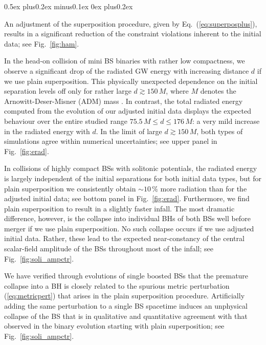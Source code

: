 \documentclass[]{iopart}
\begin{document}
\begin{list}{\rm{\bf ()}}{
                
             \parsep0.5ex plus0.2ex minus0.1ex \itemsep0ex plus0.2ex}
  \item An adjustment of the superposition procedure, given 
  by Eq.~(\ref{eq:superposplus}), results in a significant
  reduction of the constraint violations inherent to the initial data;
  see Fig.~\ref{fig:ham}.
  \item In the head-on collision of mini BS binaries with rather
  low compactness, we observe a significant drop of the radiated
  GW energy with increasing distance $d$ if we use plain superposition.
  This physically unexpected dependence on the initial separation
  levels off only for rather large $d\gtrsim 150\,M$, where $M$
  denotes the Arnowitt-Deser-Misner (ADM) mass \cite{Arnowitt:1962hi}.
  In contrast, the total radiated energy computed from the evolution
  of our adjusted initial data displays the expected behaviour over
  the entire studied range $75.5\,M\le d\le 176\,M$: a very mild
  increase in the radiated energy with $d$. In the limit of large
  $d \gtrsim 150\,M$, both types of simulations agree within numerical
  uncertainties; see upper panel in Fig.~\ref{fig:erad}.
  \item In collisions of highly compact BSs with solitonic potentials,
  the radiated energy is largely independent of the initial separations
  for both initial data types, but for plain superposition we
  consistently obtain $\sim 10\,\%$ more radiation than for the
  adjusted initial data; see bottom panel in Fig.~\ref{fig:erad}.
  Furthermore, we find plain superposition to result in a slightly
  faster infall.  The most dramatic difference, however, is the
  collapse into individual BHs of both BSs well before merger if
  we use plain superposition. No such collapse occurs if we use
  adjusted initial data. Rather, these lead to the expected
  near-constancy of the central scalar-field amplitude of the BSs
  throughout most of the infall; see Fig.~\ref{fig:soli_ampctr}.
  \item We have verified through evolutions of single boosted BSs
  that the premature collapse into a BH is closely related to the
  spurious metric perturbation (\ref{eq:metricpert}) that arises
  in the plain superposition procedure. Artificially adding the
  same perturbation to a single BS spacetime induces an unphysical
  collapse of the BS that is in qualitative and quantitative agreement
  with that observed in the binary evolution starting with plain
  superposition; see Fig.~\ref{fig:soli_ampctr}.
\end{list}
\end{document}
